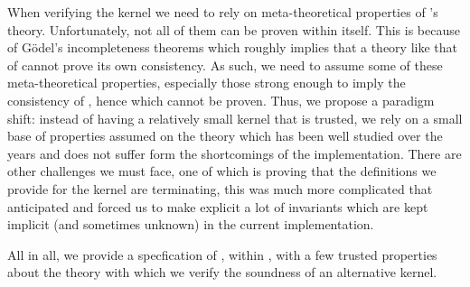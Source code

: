 When verifying the kernel we need to rely on meta-theoretical properties of
\Coq's theory. Unfortunately, not all of them can be proven within \Coq itself.
%
This is because of Gödel's incompleteness theorems which roughly implies that a
theory like that of \Coq cannot prove its own consistency. As such, we need to
assume some of these meta-theoretical properties, especially those strong enough
to imply the consistency of \Coq, hence which cannot be proven.
Thus, we propose a paradigm shift: instead of having a relatively small kernel
that is trusted, we rely on a small base of properties assumed on the theory
which has been well studied over the years and does not suffer form the
shortcomings of the implementation.
There are other challenges we must face, one of which is proving that the
definitions we provide for the kernel are terminating, this was much more
complicated that anticipated and forced us to make explicit a lot of invariants
which are kept implicit (and sometimes unknown) in the current implementation.

All in all, we provide a specfication of \Coq, within \Coq, with a few trusted
properties about the theory with which we verify the soundness of an alternative
\Coq kernel.

